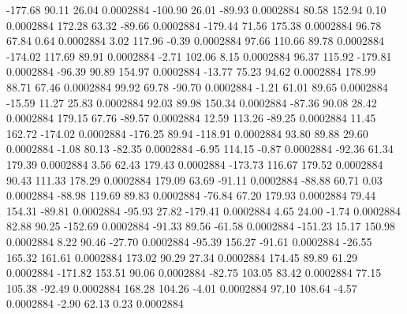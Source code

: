      -177.68       90.11       26.04     0.0002884
     -100.90       26.01      -89.93     0.0002884
       80.58      152.94        0.10     0.0002884
      172.28       63.32      -89.66     0.0002884
     -179.44       71.56      175.38     0.0002884
       96.78       67.84        0.64     0.0002884
        3.02      117.96       -0.39     0.0002884
       97.66      110.66       89.78     0.0002884
     -174.02      117.69       89.91     0.0002884
       -2.71      102.06        8.15     0.0002884
       96.37      115.92     -179.81     0.0002884
      -96.39       90.89      154.97     0.0002884
      -13.77       75.23       94.62     0.0002884
      178.99       88.71       67.46     0.0002884
       99.92       69.78      -90.70     0.0002884
       -1.21       61.01       89.65     0.0002884
      -15.59       11.27       25.83     0.0002884
       92.03       89.98      150.34     0.0002884
      -87.36       90.08       28.42     0.0002884
      179.15       67.76      -89.57     0.0002884
       12.59      113.26      -89.25     0.0002884
       11.45      162.72     -174.02     0.0002884
     -176.25       89.94     -118.91     0.0002884
       93.80       89.88       29.60     0.0002884
       -1.08       80.13      -82.35     0.0002884
       -6.95      114.15       -0.87     0.0002884
      -92.36       61.34      179.39     0.0002884
        3.56       62.43      179.43     0.0002884
     -173.73      116.67      179.52     0.0002884
       90.43      111.33      178.29     0.0002884
      179.09       63.69      -91.11     0.0002884
      -88.88       60.71        0.03     0.0002884
      -88.98      119.69       89.83     0.0002884
      -76.84       67.20      179.93     0.0002884
       79.44      154.31      -89.81     0.0002884
      -95.93       27.82     -179.41     0.0002884
        4.65       24.00       -1.74     0.0002884
       82.88       90.25     -152.69     0.0002884
      -91.33       89.56      -61.58     0.0002884
     -151.23       15.17      150.98     0.0002884
        8.22       90.46      -27.70     0.0002884
      -95.39      156.27      -91.61     0.0002884
      -26.55      165.32      161.61     0.0002884
      173.02       90.29       27.34     0.0002884
      174.45       89.89       61.29     0.0002884
     -171.82      153.51       90.06     0.0002884
      -82.75      103.05       83.42     0.0002884
       77.15      105.38      -92.49     0.0002884
      168.28      104.26       -4.01     0.0002884
       97.10      108.64       -4.57     0.0002884
       -2.90       62.13        0.23     0.0002884
